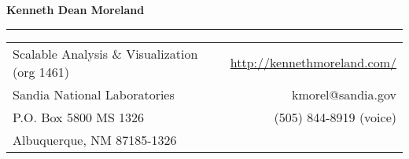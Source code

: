 \documentclass{article}
\date{August 31, 2020}
\begin{document}
\begin{center}
  \textbf{\LARGE Kenneth Dean Moreland}
\end{center}

\rule{\textwidth}{1mm}

\begin{center}
  \begin{tabular*}{\textwidth}{@{\extracolsep{\fill}}lr}
    Scalable Analysis \& Visualization (org 1461) & \url{http://kennethmoreland.com/} \\
    Sandia National Laboratories                  & kmorel@sandia.gov \\
    P.O. Box 5800 MS 1326                         & (505) 844-8919 (voice) \\
    Albuquerque, NM 87185-1326 \\
  \end{tabular*}
\end{center}

\begin{center}
  {\large
    \makeatletter
    \@date
    \makeatother
  }
\end{center}
\end{document}
